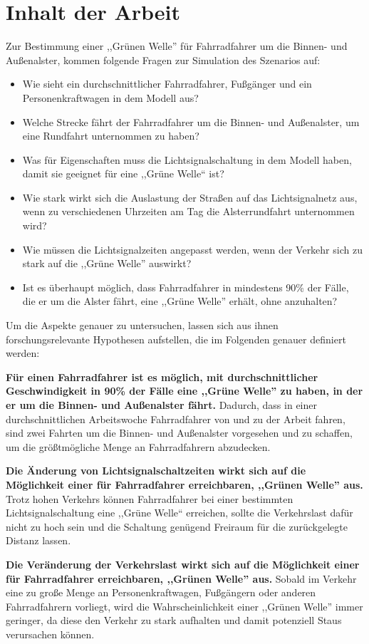 %
%
\section{Inhalt der Arbeit}

Zur Bestimmung einer ,,Grünen Welle'' für Fahrradfahrer um die Binnen- und Außenalster, kommen folgende Fragen zur Simulation des Szenarios auf:

\begin{itemize}
    \item Wie sieht ein durchschnittlicher Fahrradfahrer, Fußgänger und ein Personenkraftwagen in dem Modell aus?
    \item Welche Strecke fährt der Fahrradfahrer um die Binnen- und Außenalster, um eine Rundfahrt unternommen zu haben?
    \item Was für Eigenschaften muss die Lichtsignalschaltung in dem Modell haben, damit sie geeignet für eine ,,Grüne Welle`` ist?
    \item Wie stark wirkt sich die Auslastung der Straßen auf das Lichtsignalnetz aus, wenn zu verschiedenen Uhrzeiten am Tag die Alsterrundfahrt unternommen wird?
    \item Wie müssen die Lichtsignalzeiten angepasst werden, wenn der Verkehr sich zu stark auf die ,,Grüne Welle'' auswirkt?
    \item Ist es überhaupt möglich, dass Fahrradfahrer in mindestens 90\% der Fälle, die er um die Alster fährt, eine ,,Grüne Welle'' erhält, ohne anzuhalten?
\end{itemize}

Um die Aspekte genauer zu untersuchen, lassen sich aus ihnen forschungsrelevante Hypothesen aufstellen, die im Folgenden genauer definiert werden:

\textbf{Für einen Fahrradfahrer ist es möglich, mit durchschnittlicher Geschwindigkeit in 90\% der Fälle eine ,,Grüne Welle'' zu haben, in der er um die Binnen- und Außenalster fährt.}
Dadurch, dass in einer durchschnittlichen Arbeitswoche Fahrradfahrer von und zu der Arbeit fahren, sind zwei Fahrten um die Binnen- und Außenalster vorgesehen und zu schaffen, um die größtmögliche Menge an Fahrradfahrern abzudecken.

\textbf{Die Änderung von Lichtsignalschaltzeiten wirkt sich auf die Möglichkeit einer für Fahrradfahrer erreichbaren, ,,Grünen Welle'' aus.}
Trotz hohen Verkehrs können Fahrradfahrer bei einer bestimmten Lichtsignalschaltung eine ,,Grüne Welle`` erreichen, sollte die Verkehrslast dafür nicht zu hoch sein und die Schaltung genügend Freiraum für die zurückgelegte Distanz lassen.

\textbf{Die Veränderung der Verkehrslast wirkt sich auf die Möglichkeit einer für Fahrradfahrer erreichbaren, ,,Grünen Welle'' aus.}
Sobald im Verkehr eine zu große Menge an Personenkraftwagen, Fußgängern oder anderen Fahrradfahrern vorliegt, wird die Wahrscheinlichkeit einer ,,Grünen Welle'' immer geringer, da diese den Verkehr zu stark aufhalten und damit potenziell Staus verursachen können.
